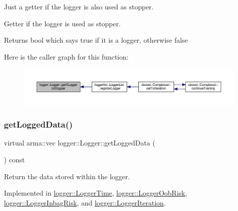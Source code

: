 Just a getter if the logger is also used as stopper. 

Getter if the logger is used as stopper.

\begin{DoxyReturn}{Returns}
{\ttfamily bool} which says {\ttfamily true} if it is a logger, otherwise {\ttfamily false} 
\end{DoxyReturn}
Here is the caller graph for this function\+:
\nopagebreak
\begin{figure}[H]
\begin{center}
\leavevmode
\includegraphics[width=350pt]{classlogger_1_1_logger_ae39cfa15ba833840ae52889c09cac994_icgraph}
\end{center}
\end{figure}
\mbox{\label{classlogger_1_1_logger_aa4fc254c532172db3404b7c0bcd17092}} 
\subsubsection{\texorpdfstring{get\+Logged\+Data()}{getLoggedData()}}
{\footnotesize\ttfamily virtual arma\+::vec logger\+::\+Logger\+::get\+Logged\+Data (\begin{DoxyParamCaption}{ }\end{DoxyParamCaption}) const\hspace{0.3cm}{\ttfamily [pure virtual]}}



Return the data stored within the logger. 



Implemented in \hyperlink{classlogger_1_1_logger_time_a8723a078c86c1470208dccadffed5c1b}{logger\+::\+Logger\+Time}, \hyperlink{classlogger_1_1_logger_oob_risk_a1529f62cf58ad8bc5922a7d39ed3515e}{logger\+::\+Logger\+Oob\+Risk}, \hyperlink{classlogger_1_1_logger_inbag_risk_abde2b1db608804ca90ce92cd0e5dde12}{logger\+::\+Logger\+Inbag\+Risk}, and \hyperlink{classlogger_1_1_logger_iteration_a2d0404feb799850420874612a435f3da}{logger\+::\+Logger\+Iteration}.

\mbox{\label{classlogger_1_1_logger_a91d987a86698e455b6fd3468f266d3fe}} 
